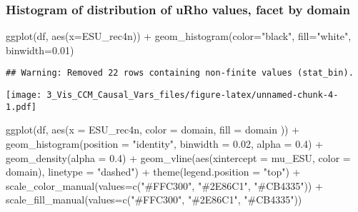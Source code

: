 \documentclass[
]{article}
\newenvironment{Shaded}{\begin{snugshade}}{\end{snugshade}}
\newcommand{\AttributeTok}[1]{\textcolor[rgb]{0.77,0.63,0.00}{#1}}
\newcommand{\FloatTok}[1]{\textcolor[rgb]{0.00,0.00,0.81}{#1}}
\newcommand{\FunctionTok}[1]{\textcolor[rgb]{0.00,0.00,0.00}{#1}}
\newcommand{\NormalTok}[1]{#1}
\newcommand{\SpecialCharTok}[1]{\textcolor[rgb]{0.00,0.00,0.00}{#1}}
\newcommand{\StringTok}[1]{\textcolor[rgb]{0.31,0.60,0.02}{#1}}
\begin{document}
\hypertarget{histogram-of-distribution-of-urho-values-facet-by-domain}{%
\subsubsection{Histogram of distribution of uRho values, facet by
domain}\label{histogram-of-distribution-of-urho-values-facet-by-domain}}

\begin{Shaded}
\begin{Highlighting}[]
\FunctionTok{ggplot}\NormalTok{(df, }\FunctionTok{aes}\NormalTok{(}\AttributeTok{x=}\NormalTok{ESU\_rec4n)) }\SpecialCharTok{+} \FunctionTok{geom\_histogram}\NormalTok{(}\AttributeTok{color=}\StringTok{"black"}\NormalTok{, }\AttributeTok{fill=}\StringTok{"white"}\NormalTok{, }\AttributeTok{binwidth=}\FloatTok{0.01}\NormalTok{)}
\end{Highlighting}
\end{Shaded}

\begin{verbatim}
## Warning: Removed 22 rows containing non-finite values (stat_bin).
\end{verbatim}

\texttt{[image: 3\_Vis\_CCM\_Causal\_Vars\_files/figure-latex/unnamed-chunk-4-1.pdf]}

\begin{Shaded}
\begin{Highlighting}[]
\FunctionTok{ggplot}\NormalTok{(df, }\FunctionTok{aes}\NormalTok{(}\AttributeTok{x =}\NormalTok{ ESU\_rec4n, }\AttributeTok{color =}\NormalTok{ domain, }\AttributeTok{fill =}\NormalTok{ domain )) }\SpecialCharTok{+}
  \FunctionTok{geom\_histogram}\NormalTok{(}\AttributeTok{position =} \StringTok{"identity"}\NormalTok{, }\AttributeTok{binwidth =} \FloatTok{0.02}\NormalTok{, }\AttributeTok{alpha =} \FloatTok{0.4}\NormalTok{) }\SpecialCharTok{+}
  \FunctionTok{geom\_density}\NormalTok{(}\AttributeTok{alpha =} \FloatTok{0.4}\NormalTok{) }\SpecialCharTok{+}
  \FunctionTok{geom\_vline}\NormalTok{(}\FunctionTok{aes}\NormalTok{(}\AttributeTok{xintercept =}\NormalTok{ mu\_ESU, }\AttributeTok{color =}\NormalTok{ domain),}
             \AttributeTok{linetype =} \StringTok{"dashed"}\NormalTok{) }\SpecialCharTok{+}
  \FunctionTok{theme}\NormalTok{(}\AttributeTok{legend.position =} \StringTok{"top"}\NormalTok{) }\SpecialCharTok{+}
  \FunctionTok{scale\_color\_manual}\NormalTok{(}\AttributeTok{values=}\FunctionTok{c}\NormalTok{(}\StringTok{"\#FFC300"}\NormalTok{, }\StringTok{"\#2E86C1"}\NormalTok{, }\StringTok{"\#CB4335"}\NormalTok{)) }\SpecialCharTok{+}
  \FunctionTok{scale\_fill\_manual}\NormalTok{(}\AttributeTok{values=}\FunctionTok{c}\NormalTok{(}\StringTok{"\#FFC300"}\NormalTok{, }\StringTok{"\#2E86C1"}\NormalTok{, }\StringTok{"\#CB4335"}\NormalTok{))}
\end{Highlighting}
\end{Shaded}
\end{document}
